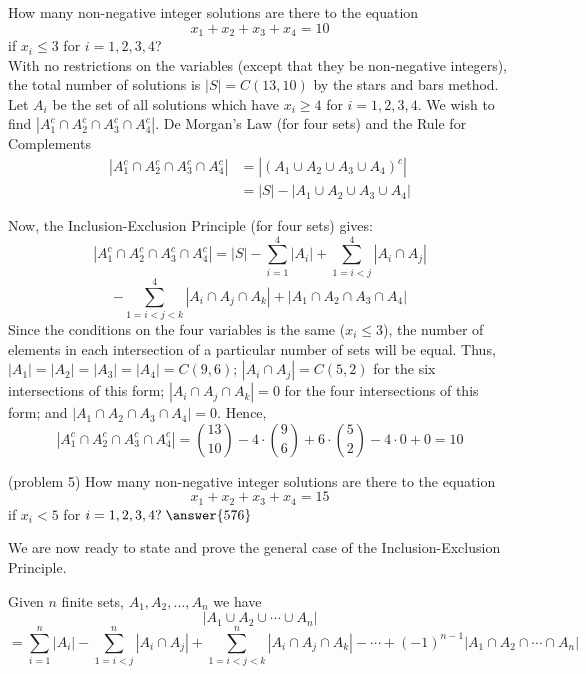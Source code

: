\documentclass[handout]{ximera}
\begin{document}
\begin{example}[example 5]
How many non-negative integer solutions are there to the equation
\[
x_1 + x_2 + x_3 + x_4  = 10
\]
if $x_i \leq 3$ for $i = 1, 2, 3, 4$?\\
With no restrictions on the variables (except that they be non-negative integers), 
the total number of solutions is $|S| = C(13, 10)$ by the stars and bars method.
Let $A_i$ be the set of all solutions which have $x_i \geq 4$ for $i = 1, 2, 3, 4$.
We wish to find $|A_1^c \cap A_2^c \cap A_3^c \cap A_4^c|$.
De Morgan's Law (for four sets) and the Rule for Complements 
\begin{align*}
|A_1^c \cap A_2^c \cap A_3^c \cap A_4^c| &= |(A_1 \cup A_2 \cup A_3 \cup A_4)^c|\\
               &= |S| - |A_1 \cup A_2 \cup A_3 \cup A_4|
\end{align*}               
   
Now, the Inclusion-Exclusion Principle (for four sets) gives:
\[
|A_1^c \cap A_2^c \cap A_3^c \cap A_4^c| = |S| - \sum_{i = 1}^4 |A_i| + \sum_{1 = i < j}^4 |A_i \cap A_j|
\]
\[
-\sum_{1 = i < j< k }^4 |A_i \cap A_j \cap A_k| + |A_1 \cap A_2 \cap A_3 \cap A_4 |
\]
Since the conditions on the four variables is the same ($x_i \leq 3$), 
the number of elements in each intersection of a particular number of sets will be equal.
Thus, $|A_1| = |A_2| =|A_3| =|A_4| = C(9,6)$; $|A_i \cap A_j| = C(5, 2)$ for the six intersections of this form;
$|A_i \cap A_j \cap A_k| = 0$ for the four intersections of this form; and $|A_1 \cap A_2 \cap A_3 \cap A_4| = 0$.
Hence,
\[
|A_1^c \cap A_2^c \cap A_3^c \cap A_4^c| = \binom{13}{10} - 4\cdot \binom{9}{6} + 6 \cdot \binom{5}{2} - 4 \cdot 0 + 0 = 10 
\]






\end{example}

\begin{problem}(problem 5)
How many non-negative integer solutions are there to the equation
\[
x_1 + x_2 + x_3 + x_4 = 15
\]
if $x_i < 5$ for $i = 1, 2, 3, 4? \; \answer{576}$

\end{problem}



We are now ready to state and prove the general case of the Inclusion-Exclusion Principle.
\begin{proposition}
Given $n$ finite sets, $A_1, A_2, \ldots, A_n$ we have
\[
|A_1 \cup A_2 \cup \cdots \cup A_n| 
\]
\[
= \sum_{i =1}^n |A_i| - \sum_{1 =i<j}^n |A_i\cap A_j| +
\sum_{1 =i<j< k}^n |A_i\cap A_j \cap A_k| - \cdots + (-1)^{n-1} |A_1 \cap A_2 \cap \cdots \cap A_n|
\]
\end{proposition}
\end{document}
